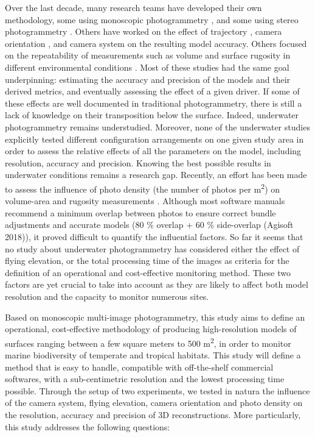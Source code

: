 Over the last decade, many research teams have developed their own methodology, some using monoscopic photogrammetry \citep{figueira_accuracy_2015, gutierrez-heredia_simple_2015, burns_integrating_2015,burns_utilizing_2015, burns_assessing_2016}, and some using stereo photogrammetry \citep{abdo_efficiently_2006, bryson_characterization_2017, pizarro_simple_2017, ferrari_quantifying_2016}. Others have worked on the effect of trajectory \citep{pizarro_simple_2017}, camera orientation \citep{chiabrando_influence_2017, raczynski_accuracy_2017}, and camera system \citep{guo_accuracy_2016} on the resulting model accuracy. Others focused on the repeatability of measurements such as volume \citep{lavy_quick_2015} and surface rugosity in different environmental conditions \citep{bryson_characterization_2017}. Most of these studies had the same goal underpinning: estimating the accuracy and precision of the models and their derived metrics, and eventually assessing the effect of a given driver. If some of these effects are well documented in traditional photogrammetry, there is still a lack of knowledge on their transposition below the surface. Indeed, underwater photogrammetry remains understudied. Moreover, none of the underwater studies explicitly tested different configuration arrangements on one given study area in order to assess the relative effects of all the parameters on the model, including resolution, accuracy and precision. Knowing the best possible results in underwater conditions remains a research gap. Recently, an effort has been made to assess the influence of photo density (the number of photos per m\textsuperscript{2}) on volume-area \citep{raoult_how_2017} and rugosity measurements \citep{bryson_characterization_2017}. Although most software manuals recommend a minimum overlap between photos to ensure correct bundle adjustments and accurate models (80 \% overlap + 60 \% side-overlap (Agisoft 2018)), it proved difficult to quantify the influential factors. So far it seems that no study about underwater photogrammetry has considered either the effect of flying elevation, or the total processing time of the images as criteria for the definition of an operational and cost-effective monitoring method. These two factors are yet crucial to take into account as they are likely to affect both model resolution and the capacity to monitor numerous sites.

Based on monoscopic multi-image photogrammetry, this study aims to define an operational, cost-effective methodology of producing high-resolution models of surfaces ranging between a few square meters to 500 m\textsuperscript{2}, in order to monitor marine biodiversity of temperate and tropical habitats. This study will define a method that is easy to handle, compatible with off-the-shelf commercial softwares, with a sub-centimetric resolution and the lowest processing time possible. Through the setup of two experiments, we tested in natura the influence of the camera system, flying elevation, camera orientation and photo density on the resolution, accuracy and precision of 3D reconstructions. More particularly, this study addresses the following questions:

